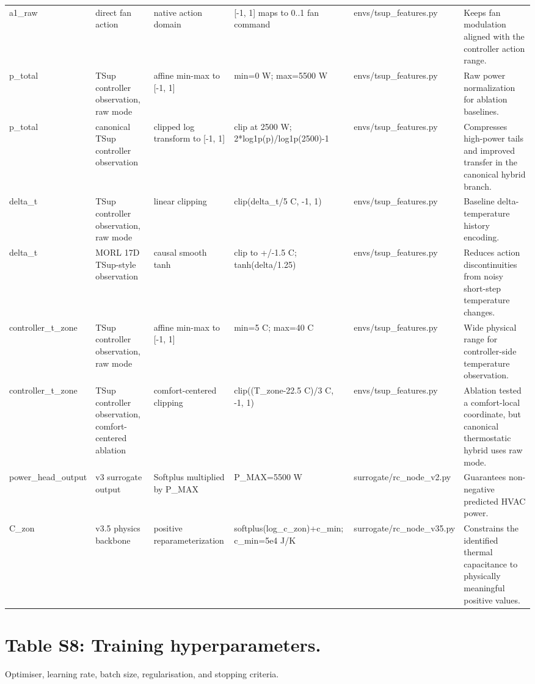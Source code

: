 \documentclass[11pt,a4paper]{article}
\begin{document}
\begin{small}
\begin{longtable}{L{2.75cm} L{2.75cm} L{2.75cm} L{2.75cm} L{2.75cm} L{2.75cm}}
a1\_raw & direct fan action & native action domain & [-1, 1] maps to 0..1 fan command & envs/tsup\_features.py & Keeps fan modulation aligned with the controller action range. \\
p\_total & TSup controller observation, raw mode & affine min-max to [-1, 1] & min=0 W; max=5500 W & envs/tsup\_features.py & Raw power normalization for ablation baselines. \\
p\_total & canonical TSup controller observation & clipped log transform to [-1, 1] & clip at 2500 W; 2*log1p(p)/log1p(2500)-1 & envs/tsup\_features.py & Compresses high-power tails and improved transfer in the canonical hybrid branch. \\
delta\_t & TSup controller observation, raw mode & linear clipping & clip(delta\_t/5 C, -1, 1) & envs/tsup\_features.py & Baseline delta-temperature history encoding. \\
delta\_t & MORL 17D TSup-style observation & causal smooth tanh & clip to +/-1.5 C; tanh(delta/1.25) & envs/tsup\_features.py & Reduces action discontinuities from noisy short-step temperature changes. \\
controller\_t\_zone & TSup controller observation, raw mode & affine min-max to [-1, 1] & min=5 C; max=40 C & envs/tsup\_features.py & Wide physical range for controller-side temperature observation. \\
controller\_t\_zone & TSup controller observation, comfort-centered ablation & comfort-centered clipping & clip((T\_zone-22.5 C)/3 C, -1, 1) & envs/tsup\_features.py & Ablation tested a comfort-local coordinate, but canonical thermostatic hybrid uses raw mode. \\
power\_head\_output & v3 surrogate output & Softplus multiplied by P\_MAX & P\_MAX=5500 W & surrogate/rc\_node\_v2.py & Guarantees non-negative predicted HVAC power. \\
C\_zon & v3.5 physics backbone & positive reparameterization & softplus(log\_c\_zon)+c\_min; c\_min=5e4 J/K & surrogate/rc\_node\_v35.py & Constrains the identified thermal capacitance to physically meaningful positive values. \\
\end{longtable}
\end{small}

\section*{Table S8:  Training hyperparameters.}
Optimiser, learning rate, batch size, regularisation, and stopping criteria.
\end{document}
